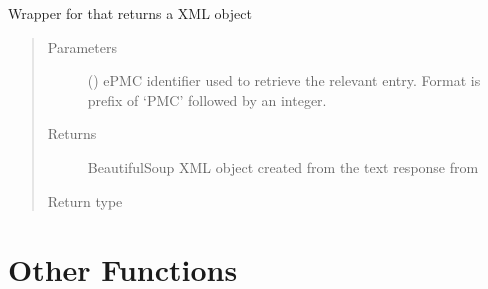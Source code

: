 \documentclass[letterpaper,10pt,english]{sphinxmanual}
\begin{document}
\begin{fulllineitems}
\label{\detokenize{functions:pyresid.parse_request}}
Wrapper for {\hyperref[\detokenize{functions:pyresid.request_fulltextXML}]{}} that returns a  XML object
\begin{quote}\begin{description}
\item[{Parameters}] \leavevmode
{} () \textendash{} ePMC identifier used to retrieve the relevant entry. Format is prefix of ‘PMC’
followed by an integer.

\item[{Returns}] \leavevmode
{} \textendash{} BeautifulSoup XML object created from the text response from  {\hyperref[\detokenize{functions:pyresid.request_fulltextXML}]{}}

\item[{Return type}] \leavevmode
{}

\end{description}\end{quote}




{\hyperref[\detokenize{functions:pyresid.request_fulltextXML}]{}}



\end{fulllineitems}



\chapter{Other Functions}
\label{\detokenize{functions:other-functions}}
\end{document}
